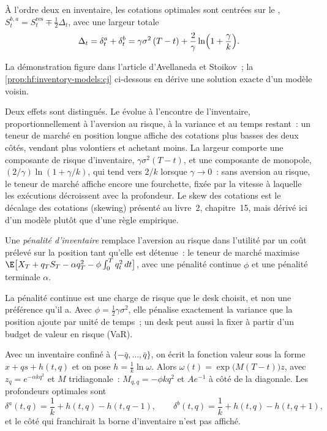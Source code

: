 \begin{proposition}\label{prop:hf:inventory-models:as}
À l'ordre deux en inventaire, les cotations optimales sont centrées sur le , $S^{b,a}_t=S^{\mathrm{res}}_t\mp\tfrac12\Delta_t$, avec
une largeur totale
\[
\Delta_t=\delta^a_t+\delta^b_t=\gamma\sigma^2\,(T-t)+\frac{2}{\gamma}\ln\Bigl(1+\frac{\gamma}{k}\Bigr).
\]
\end{proposition}

\admitted
La démonstration figure dans l'article d'Avellaneda et Stoikov~; la \cref{prop:hf:inventory-models:cj} ci-dessous en dérive une solution exacte d'un modèle voisin.

Deux effets sont distingués. Le  évolue à l'encontre de l'inventaire, proportionnellement à l'aversion au risque, à la variance et au temps restant~: un teneur de marché en position
longue affiche des cotations plus basses des deux côtés, vendant plus volontiers et achetant moins. La largeur comporte une composante de risque d'inventaire, $\gamma\sigma^2(T-t)$, et une
composante de monopole, $(2/\gamma)\ln(1+\gamma/k)$, qui tend vers $2/k$ lorsque $\gamma\to0$~: sans aversion au risque, le teneur de marché affiche encore une fourchette,
fixée par la vitesse à laquelle les exécutions décroissent avec la profondeur. Le skew des cotations est le décalage des cotations (skewing) présenté au livre~2, chapitre~15, mais dérivé ici d'un modèle plutôt que
d'une règle empirique.

\begin{definition}\label{def:hf:inventory-models:penalty}
Une \emph{pénalité d'inventaire} remplace l'aversion au risque dans l'utilité par un coût prélevé sur la position tant qu'elle est détenue~: le
teneur de marché maximise $\E\bigl[X_T+q_TS_T-\alpha q_T^2-\phi\int_0^Tq_t^2\,dt\bigr]$, avec une pénalité continue $\phi$ et une pénalité terminale $\alpha$.
\end{definition}

La pénalité continue est une charge de risque que le desk choisit, et non une préférence qu'il a. Avec $\phi=\tfrac12\gamma\sigma^2$, elle pénalise exactement la variance
que la position ajoute par unité de temps~; un desk peut aussi la fixer à partir d'un budget de valeur en risque (VaR).

\begin{proposition}\label{prop:hf:inventory-models:cj}
Avec un inventaire confiné à $\{-\bar q,\dots,\bar q\}$, on écrit la fonction valeur sous la forme $x+qs+h(t,q)$ et on pose $h=\tfrac1k\ln\omega$. Alors
$\omega(t)=\exp\bigl(M(T-t)\bigr)z$, avec $z_q=e^{-\alpha kq^2}$ et $M$ tridiagonale~: $M_{q,q}=-\phi kq^2$ et $Ae^{-1}$ à côté de la diagonale.
Les profondeurs optimales sont
\[
\delta^a(t,q)=\frac1k+h(t,q)-h(t,q-1),\qquad \delta^b(t,q)=\frac1k+h(t,q)-h(t,q+1),
\]
et le côté qui franchirait la borne d'inventaire n'est pas affiché.
\end{proposition}

